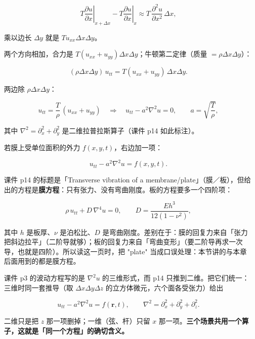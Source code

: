 \[
T\left.\frac{\partial u}{\partial x}\right|_{x+\Delta x}-T\left.\frac{\partial u}{\partial x}\right|_{x}
\approx T\,\frac{\partial^2u}{\partial x^2}\,\Delta x ,
\]

乘以边长 $\Delta y$ 就是 $Tu_{xx}\Delta x\Delta y$。

两个方向相加，合力是 $T(u_{xx}+u_{yy})\Delta x\Delta y$；牛顿第二定律（质量 $=\rho\Delta x\Delta y$）：

\[
(\rho\Delta x\Delta y)\,u_{tt}=T(u_{xx}+u_{yy})\,\Delta x\Delta y .
\]

两边除 $\rho\Delta x\Delta y$：

\[
u_{tt}=\frac{T}{\rho}\,(u_{xx}+u_{yy})
\quad\Longrightarrow\quad
u_{tt}-a^2\nabla^2u=0,
\qquad a=\sqrt{\frac{T}{\rho}},
\]

其中 $\nabla^2=\partial_x^2+\partial_y^2$ 是二维拉普拉斯算子（课件 p14 如此标注）。


若膜上受单位面积的外力 $f(x,y,t)$，右边加一项：

\[
u_{tt}-a^2\nabla^2u=f(x,y,t).
\]


课件 p14 的标题是「Transverse vibration of a membrane/plate」（膜／板），但给出的方程是\textbf{膜方程}：只有张力、没有弯曲刚度。板的方程要多一个四阶项：

\[
\rho\,u_{tt}+D\,\nabla^4u=0,
\qquad D=\frac{E h^3}{12(1-\nu^2)},
\]

其中 $h$ 是板厚、$\nu$ 是泊松比、$D$ 是弯曲刚度。差别在于：膜的回复力来自「张力把斜边拉平」（二阶导就够）；板的回复力来自「弯曲变形」（要二阶导再求一次导，也就是四阶）。所以读这一页时，把 "plate" 当成口误处理：本节讲的与本章后面用到的都是膜方程。


课件 p3 的波动方程写的是 $\nabla^2u$ 的三维形式，而 p14 只推到二维。把它们统一：三维时同一套推导（取 $\Delta x\Delta y\Delta z$ 的立方体微元，六个面各受张力）给出

\[
u_{tt}-a^2\nabla^2u=f(\mathbf r,t),
\qquad
\nabla^2=\partial_x^2+\partial_y^2+\partial_z^2 .
\]

二维只是把 $z$ 那一项删掉；一维（弦、杆）只留 $x$ 那一项。\textbf{三个场景共用一个算子，这就是「同一个方程」的确切含义。}

\label{sec:716}


